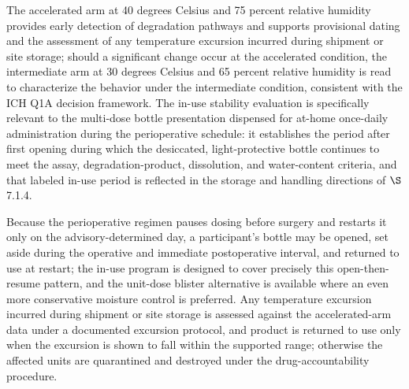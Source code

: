 The accelerated arm at 40 degrees Celsius and 75 percent relative
humidity provides early detection of degradation pathways and supports provisional
dating and the assessment of any temperature excursion incurred during shipment or
site storage; should a significant change occur at the accelerated condition, the
intermediate arm at 30 degrees Celsius and 65 percent relative humidity is read to
characterize the behavior under the intermediate condition, consistent with the
ICH Q1A decision framework. The in-use stability evaluation is specifically
relevant to the multi-dose bottle presentation dispensed for at-home once-daily
administration during the perioperative schedule: it establishes the period after
first opening during which the desiccated, light-protective bottle continues to
meet the assay, degradation-product, dissolution, and water-content criteria, and
that labeled in-use period is reflected in the storage and handling directions of
$\S$7.1.4. 

Because the perioperative regimen pauses dosing before surgery and
restarts it only on the advisory-determined day, a participant's bottle may be
opened, set aside during the operative and immediate postoperative interval, and
returned to use at restart; the in-use program is designed to cover precisely this
open-then-resume pattern, and the unit-dose blister alternative is available where
an even more conservative moisture control is preferred. Any temperature excursion
incurred during shipment or site storage is assessed against the accelerated-arm
data under a documented excursion protocol, and product is returned to use only
when the excursion is shown to fall within the supported range; otherwise the
affected units are quarantined and destroyed under the drug-accountability
procedure.

